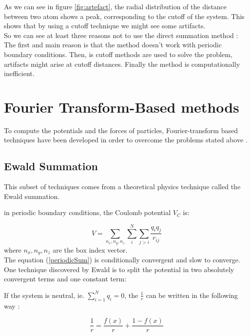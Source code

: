 \documentclass[12pt,twoside,a4paper]{report}
\begin{document}
As we can see in figure \ref{fig:artefact},  the radial distribution of the distance between two atom shows a peak, corresponding to the cutoff of the system. This shows that by using a cutoff technique we might see some artifacts.\\

So we can see at least three reasons not to use the direct summation method : The first and main reason is that the method doesn't work with periodic boundary conditions. Then, is cutoff methods are used to solve the problem, artifacts might arise at cutoff distances. Finally the method is computationally inefficient.





\section{Fourier Transform-Based methods}

To compute the potentials and the forces of particles,  Fourier-transform based techniques have been developed in order to overcome the problems stated above .

\subsection{Ewald Summation}

This subset of techniques comes from a theoretical physics technique called the Ewald summation.

in periodic boundary conditions, the Coulomb potential $V_C$ is:

\begin{equation}
	V = \sum_{n_x,n_y,n_z} \sum_{i}^{N} \sum_{j>i} \frac{q_i q_j}{r_{ij}}
	\label{periodicSum}
\end{equation}
where $n_x,n_y,n_z$ are the box index vector.\\

The equation (\ref{periodicSum}) is conditionally convergent and slow to converge. One technique discovered by Ewald is to split the potential in two absolutely convergent terms and one constant term:


If the system is neutral, ie. $\sum_{i=1}^N q_i = 0$, the $\frac{1}{r}$ can be written in the following way :

\begin{equation}
   \frac{1}{r} = \frac{f(x)}{r} + \frac{1 - f(x)}{r}
\end{equation}
\end{document}
